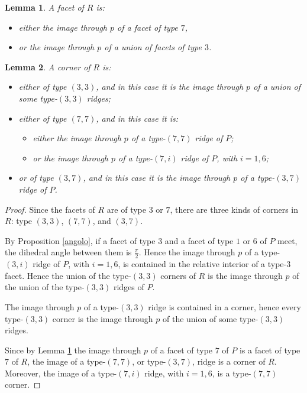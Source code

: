 \documentclass[10pt,a4paper]{amsart}
\newtheorem{lemma}{Lemma}
\begin{document}
\begin{lemma}
\label{tipi}
    A facet of $R$ is:
    \begin{itemize}
        \item either the image through $p$ of a facet of type $7$,
        \item or the image through $p$ of a union of facets of type $3$.
    \end{itemize}
\end{lemma}

\begin{lemma}
\label{corner}
    A corner of $R$ is:
    \begin{itemize}
        \item either of type $(3,3)$, and in this case it is the image through $p$ of a union of some type-$(3,3)$ ridges;
        \item either of type $(7,7)$, and in this case it is:
        \begin{itemize}
            \item either the image through $p$ of a type-$(7,7)$ ridge of $P$;
            \item or the image through $p$ of a type-$(7,i)$ ridge of $P$, with $i=1,6$;
        \end{itemize}
        
        \item or of type $(3,7)$, and in this case it is the image through $p$ of a type-$(3,7)$ ridge of $P$.
    \end{itemize}
\end{lemma}

\begin{proof}
    Since the facets of $R$ are of type $3$ or $7$, there are three kinds of corners in $R$: type $(3,3)$, $(7,7)$, and $(3,7)$.

    By Proposition \ref{angolo}, if a facet of type $3$ and a facet of type $1$ or $6$ of $P$ meet, the dihedral angle between them is $\frac{\pi}{2}$. Hence the image through $p$ of a type-$(3,i)$ ridge of $P$, with $i=1,6$, is contained in the relative interior of a type-$3$ facet. Hence the union of the type-$(3,3)$ corners of $R$ is the image through $p$ of the union of the type-$(3,3)$ ridges of $P$.

    The image through $p$ of a type-$(3,3)$ ridge is contained in a corner, hence every type-$(3,3)$ corner is the image through $p$ of the union of some type-$(3,3)$ ridges.
    

    Since by Lemma \ref{tipi} the image through $p$ of a facet of type $7$ of $P$ is a facet of type $7$ of $R$, the image of a type-$(7,7)$, or type-$(3,7)$, ridge is a corner of $R$. Moreover,  the image of a type-$(7,i)$ ridge, with $i=1,6$, is a type-$(7,7)$ corner.
\end{proof}
\end{document}
